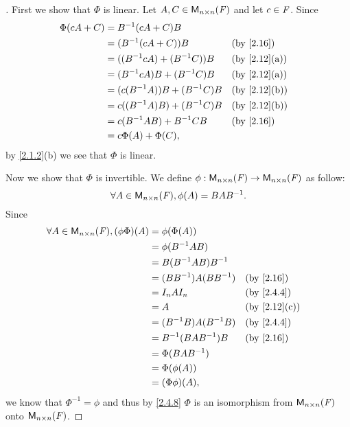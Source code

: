 \begin{proof}[]
  First we show that \(\Phi\) is linear.
  Let \(A, C \in \ms[n][n][\F]\) and let \(c \in \mathit{F}\).
  Since
  \begin{align*}
    \Phi(cA + C) & = B^{-1} (cA + C) B                                 \\
                 & = (B^{-1} (cA + C)) B             &  & \by{2.16}    \\
                 & = ((B^{-1} c A) + (B^{-1} C)) B   &  & \by{2.12}[a] \\
                 & = (B^{-1} c A) B + (B^{-1} C) B   &  & \by{2.12}[a] \\
                 & = (c (B^{-1} A)) B + (B^{-1} C) B &  & \by{2.12}[b] \\
                 & = c ((B^{-1} A) B) + (B^{-1} C) B &  & \by{2.12}[b] \\
                 & = c (B^{-1} A B) + B^{-1} CB      &  & \by{2.16}    \\
                 & = c \Phi(A) + \Phi(C),
  \end{align*}
  by \cref{2.1.2}(b) we see that \(\Phi\) is linear.

  Now we show that \(\Phi\) is invertible.
  We define \(\phi : \ms[n][n][\F] \to \ms[n][n][\F]\) as follow:
  \[
    \forall A \in \ms[n][n][\F], \phi(A) = BAB^{-1}.
  \]
  Since
  \begin{align*}
    \forall A \in \ms[n][n][\F], (\phi \Phi)(A) & = \phi(\Phi(A))                             \\
                                                & = \phi(B^{-1} AB)                           \\
                                                & = B(B^{-1} AB) B^{-1}                       \\
                                                & = (BB^{-1}) A (BB^{-1})   &  & \by{2.16}    \\
                                                & = I_n A I_n               &  & \by{2.4.4}   \\
                                                & = A                       &  & \by{2.12}[c] \\
                                                & = (B^{-1} B) A (B^{-1} B) &  & \by{2.4.4}   \\
                                                & = B^{-1} (BAB^{-1}) B     &  & \by{2.16}    \\
                                                & = \Phi(BAB^{-1})                            \\
                                                & = \Phi(\phi(A))                             \\
                                                & = (\Phi \phi)(A),
  \end{align*}
  we know that \(\Phi^{-1} = \phi\) and thus by \cref{2.4.8} \(\Phi\) is an isomorphism from \(\ms[n][n][\F]\) onto \(\ms[n][n][\F]\).
\end{proof}

